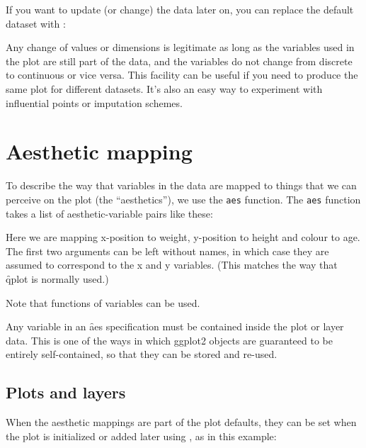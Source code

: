 If you want to update (or change) the data later on, you can replace the default dataset with \code{\%+\%}:

% 


\noindent Any change of values or dimensions is legitimate as long as the variables used in the plot are still part of the data, and the variables do not change from discrete to continuous or vice versa.  This facility can be useful if you need to produce the same plot for different datasets.  It's also an easy way to experiment with influential points or imputation schemes.


\section{Aesthetic mapping}
\label{sec:aes}

To describe the way that variables in the data are mapped to things that we can perceive on the plot (the ``aesthetics''), we use the {\tt aes} function.  The {\tt aes} function takes a list of aesthetic-variable pairs like these:

% 


Here we are mapping x-position to weight, y-position to height and colour to age.  The first two arguments can be left without names, in which case they are assumed to correspond to the x and y variables.  (This matches the way that \f{qplot} is normally used.)

% 

\noindent Note that functions of variables can be used.

Any variable in an \f{aes} specification must be contained inside the plot or layer data.  This is one of the ways in which ggplot2 objects are guaranteed to be entirely self-contained, so that they can be stored and re-used.

\subsection{Plots and layers}
\label{sub:plots_and_layers}

When the aesthetic mappings are part of the plot defaults, they can be set when the plot is initialized or added later using \code{+}, as in this example:

